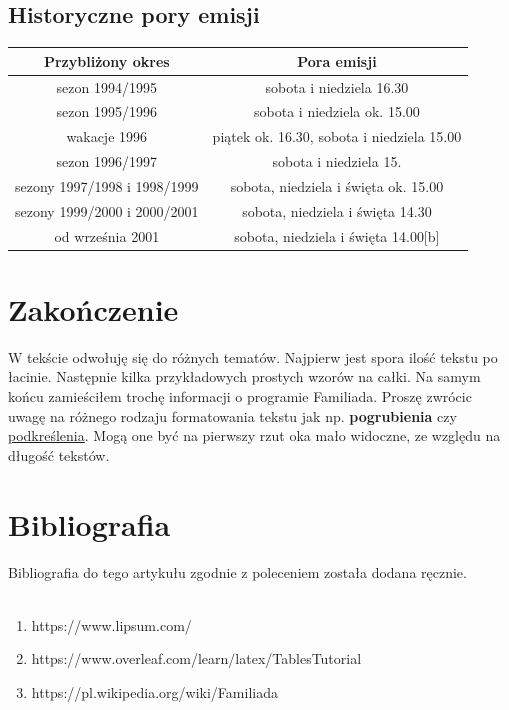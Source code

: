 \documentclass{article}
\begin{document}
\subsection{Historyczne pory emisji}

\begin{center}
\begin{tabular}{ |c|c| }
\hline
\textbf{Przybliżony okres} & \textbf{Pora emisji}\\
\hline
sezon 1994/1995 & sobota i niedziela 16.30\\
sezon 1995/1996 & sobota i niedziela ok. 15.00\\
wakacje 1996 & piątek ok. 16.30, sobota i niedziela 15.00\\
sezon 1996/1997 & sobota i niedziela 15.\\
sezony 1997/1998 i 1998/1999 & sobota, niedziela i święta ok. 15.00\\
sezony 1999/2000 i 2000/2001 & sobota, niedziela i święta 14.30\\
od września 2001 & sobota, niedziela i święta 14.00[b]\\
\hline
\end{tabular}
\end{center}

\section{Zakończenie}
W tekście odwołuję się do różnych tematów. Najpierw jest spora ilość tekstu po łacinie. Następnie kilka przykładowych prostych wzorów na 
całki. Na samym końcu zamieściłem trochę informacji o programie Familiada. Proszę zwrócic uwagę na różnego rodzaju formatowania tekstu 
jak np. \textbf{pogrubienia} czy \underline{podkreślenia}. Mogą one być na pierwszy rzut oka mało widoczne, ze względu na długość 
tekstów. 

\section{Bibliografia}
Bibliografia do tego artykułu zgodnie z poleceniem została dodana ręcznie.\\
\\
\begin{enumerate}
\item https://www.lipsum.com/
\item https://www.overleaf.com/learn/latex/TablesTutorial
\item https://pl.wikipedia.org/wiki/Familiada
\end{enumerate}
\end{document}
